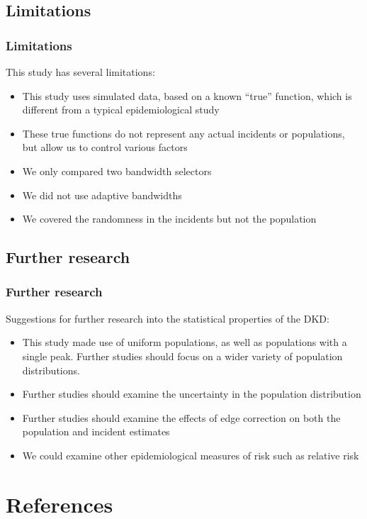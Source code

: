 \documentclass[notheorems]{beamer}
\theoremstyle{definition}
\theoremstyle{example}
\begin{document}
\subsection{Limitations}
\begin{frame}\frametitle{Limitations}
    This study has several limitations:
    \\
    \begin{itemize}
        \item This study uses simulated data, based on a known ``true'' function, which is different from a typical epidemiological study
        \item These true functions do not represent any actual incidents or populations, but allow us to control various factors
        \item We only compared two bandwidth selectors
        \item We did not use adaptive bandwidths
        \item We covered the randomness in the incidents but not the population
    \end{itemize}
\end{frame}

\subsection{Further research}
\begin{frame}\frametitle{Further research}
    Suggestions for further research into the statistical properties of the DKD:
    \\
    \begin{itemize}
        \item This study made use of uniform populations, as well as populations with a single peak. Further studies should focus on a wider variety of population distributions.
        \item Further studies should examine the uncertainty in the population distribution
        \item Further studies should examine the effects of edge correction on both the population and incident estimates
        \item We could examine other epidemiological measures of risk such as relative risk
    \end{itemize}
\end{frame}

\section*{References}
\end{document}
